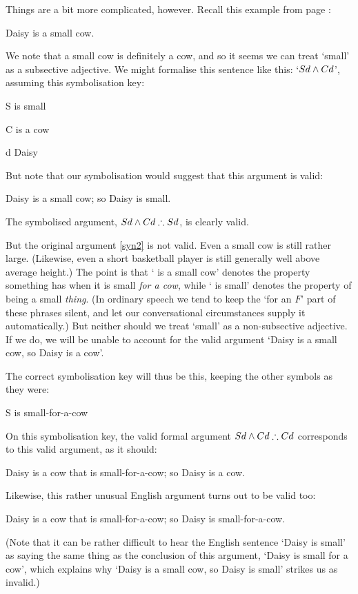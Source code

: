 Things are a bit more complicated, however. Recall this example from page \pageref{daisy}:
\begin{earg}
	\item[] Daisy is a small cow.
\end{earg} We note that a small cow is definitely a cow, and so it seems we can treat `small' as a subsective adjective. We might formalise this sentence like this: `$Sd \wedge Cd$', assuming this symbolisation key:
	\begin{ekey}
		\item[S\meta{x}]  is small
		\item[C\meta{x}]  is a cow
		\item[d] Daisy
	\end{ekey}
But note that our symbolisation would suggest that this argument is valid: \begin{earg}
	\item[\ex{syn2}] Daisy is a small cow; so Daisy is small.
\end{earg} The symbolised argument, $Sd \wedge Cd \mathrel{\therefore} Sd$, is clearly valid.

But the original argument \ref{syn2} is not valid. Even a small cow is still rather large. (Likewise, even a short basketball player is still generally well above average height.) The point is that ` is a small cow' denotes the property something has when it is small \emph{for a cow}, while ` is small' denotes the property of being a small \emph{thing}. (In ordinary speech we tend to keep the  `for an $F$' part of these phrases silent, and let our conversational circumstances supply it automatically.) But neither should we treat `small' as a non-subsective adjective. If we do, we will be unable to account for the valid argument `Daisy is a small cow, so Daisy is a cow'. 

The correct symbolisation key will thus be this, keeping the other symbols as they were: 
	\begin{ekey}
		\item[S\meta{x}]  is small-for-a-cow
	\end{ekey} On this symbolisation key, the valid formal argument $Sd \wedge Cd \mathrel{\therefore} Cd$ corresponds to this valid argument, as it should:
	\begin{earg}
		\item[] Daisy is a cow that is small-for-a-cow; so Daisy is a cow.
	\end{earg} 
Likewise, this rather unusual English argument turns out to be valid too: \begin{earg}
		\item[] Daisy is a cow that is small-for-a-cow; so Daisy is small-for-a-cow.
	\end{earg} (Note that it can be rather difficult to hear the English sentence `Daisy is small' as saying the same thing as the conclusion of this argument, `Daisy is small for a cow', which explains why `Daisy is a small cow, so Daisy is small' strikes us as invalid.)

